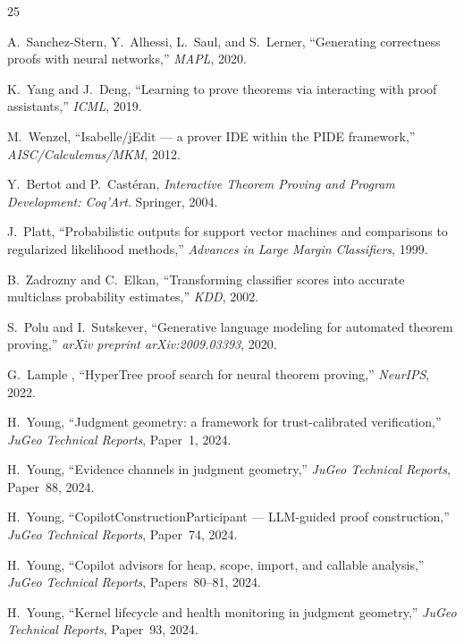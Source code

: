 \documentclass[11pt]{article}
\begin{document}
\begin{thebibliography}{25}

A.~Sanchez-Stern, Y.~Alhessi, L.~Saul, and S.~Lerner,
``Generating correctness proofs with neural networks,''
\emph{MAPL}, 2020.

K.~Yang and J.~Deng,
``Learning to prove theorems via interacting with proof
assistants,''
\emph{ICML}, 2019.

M.~Wenzel,
``Isabelle/jEdit --- a prover IDE within the PIDE framework,''
\emph{AISC/Calculemus/MKM}, 2012.

Y.~Bertot and P.~Cast\'{e}ran,
\emph{Interactive Theorem Proving and Program Development:
Coq'Art}.
Springer, 2004.

J.~Platt,
``Probabilistic outputs for support vector machines and
comparisons to regularized likelihood methods,''
\emph{Advances in Large Margin Classifiers}, 1999.

B.~Zadrozny and C.~Elkan,
``Transforming classifier scores into accurate multiclass
probability estimates,''
\emph{KDD}, 2002.

S.~Polu and I.~Sutskever,
``Generative language modeling for automated theorem proving,''
\emph{arXiv preprint arXiv:2009.03393}, 2020.

G.~Lample \etal{},
``HyperTree proof search for neural theorem proving,''
\emph{NeurIPS}, 2022.

H.~Young,
``Judgment geometry: a framework for trust-calibrated
verification,''
\emph{JuGeo Technical Reports}, Paper~1, 2024.

H.~Young,
``Evidence channels in judgment geometry,''
\emph{JuGeo Technical Reports}, Paper~88, 2024.

H.~Young,
``CopilotConstructionParticipant --- LLM-guided proof
construction,''
\emph{JuGeo Technical Reports}, Paper~74, 2024.

H.~Young,
``Copilot advisors for heap, scope, import, and callable
analysis,''
\emph{JuGeo Technical Reports}, Papers~80--81, 2024.

H.~Young,
``Kernel lifecycle and health monitoring in judgment geometry,''
\emph{JuGeo Technical Reports}, Paper~93, 2024.


\end{thebibliography}
\end{document}
